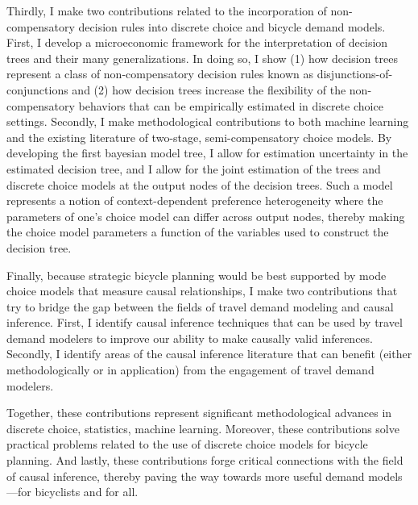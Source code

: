 \documentclass{article}
\begin{document}
Thirdly, I make two contributions related to the incorporation of non-compensatory decision rules into discrete choice and bicycle demand models. First, I develop a microeconomic framework for the interpretation of decision trees and their many generalizations. In doing so, I show (1) how decision trees represent a class of non-compensatory decision rules known as disjunctions-of-conjunctions and (2) how decision trees increase the flexibility of the non-compensatory behaviors that can be empirically estimated in discrete choice settings. Secondly, I make methodological contributions to both machine learning and the existing literature of two-stage, semi-compensatory choice models. By developing the first bayesian model tree, I allow for estimation uncertainty in the estimated decision tree, and I allow for the joint estimation of the trees and discrete choice models at the output nodes of the decision trees. Such a model represents a notion of context-dependent preference heterogeneity where the parameters of one's choice model can differ across output nodes, thereby making the choice model parameters a function of the variables used to construct the decision tree.

Finally, because strategic bicycle planning would be best supported by mode choice models that measure causal relationships, I make two contributions that try to bridge the gap between the fields of travel demand modeling and causal inference. First, I identify causal inference techniques that can be used by travel demand modelers to improve our ability to make causally valid inferences. Secondly, I identify areas of the causal inference literature that can benefit (either methodologically or in application) from the engagement of travel demand modelers.

Together, these contributions represent significant methodological advances in discrete choice, statistics, machine learning. Moreover, these contributions solve practical problems related to the use of discrete choice models for bicycle planning. And lastly, these contributions forge critical connections with the field of causal inference, thereby paving the way towards more useful demand models---for bicyclists and for all.
\end{document}
